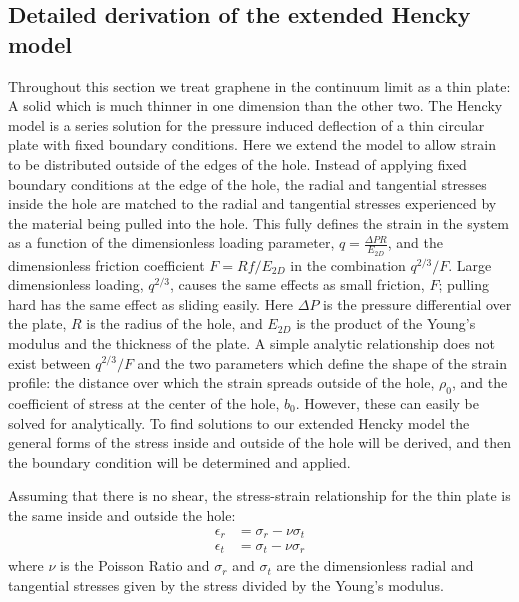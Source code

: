 \subsection{Detailed derivation of the extended Hencky model}
Throughout this section we treat graphene in the continuum limit as a thin plate: A solid which is much thinner in one dimension than the other two.  The Hencky model \cite{Hencky1915,Fichter1997} is a series solution for the pressure induced deflection of a thin circular plate with fixed boundary conditions. Here we extend the model to allow strain to be distributed outside of the edges of the hole.  Instead of applying fixed boundary conditions at the edge of the hole, the radial and tangential stresses inside the hole are matched to the radial and tangential stresses experienced by the material being pulled into the hole.  This fully defines the strain in the system as a function of the dimensionless loading parameter, $q=\frac{\Delta PR}{E_{2D}}$, and the dimensionless friction coefficient $F=Rf/E_{2D}$ in the combination $q^{2/3}/F$. Large dimensionless loading, $q^{2/3}$, causes the same effects as  small friction, $F$;  pulling hard has the same effect as sliding easily. Here $\Delta P$ is the pressure differential over the plate, $R$ is the radius of the hole, and $E_{2D}$ is the product of the Young's modulus and the thickness of the plate.  A simple analytic relationship does not exist between  $q^{2/3}/F$ and the two parameters which define the shape of the strain profile: the distance over which the strain spreads outside of the hole, $\rho_0$, and the coefficient of stress at the center of the hole, $b_0$.  However, these can easily be solved for analytically.  To find solutions to our extended Hencky model the general forms of the stress inside and outside of the hole will be derived, and then the boundary condition will be determined and applied.

Assuming that there is no shear, the stress-strain relationship for the thin plate is the same inside and outside the hole\cite{Landau1986}:
\begin{align}
\epsilon_r&=\sigma_r-\nu \sigma_t \label{esr}\\
\epsilon_t&=\sigma_t-\nu \sigma_r \label{est}
\end{align}
where $\nu$ is the Poisson Ratio and $\sigma_r$ and $\sigma_t$ are the dimensionless radial and tangential stresses given by the stress divided by the Young's modulus.

